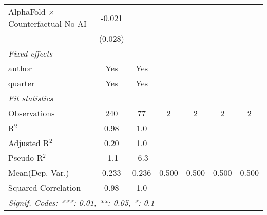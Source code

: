 \begin{tabular}{lcccccc}
   AlphaFold $\times$ Counterfactual No AI  & -0.021        &                &     &     &     &   \\   
                                            & (0.028)       &                &     &     &     &   \\   
   \midrule
   \emph{Fixed-effects}\\
   author                                   & Yes           & Yes            &     &     &     & \\  
   quarter                                  & Yes           & Yes            &     &     &     & \\  
   \midrule
   \emph{Fit statistics}\\
   Observations                             & 240           & 77             & 2   & 2   & 2   & 2\\  
   R$^2$                                    & 0.98          & 1.0            &     &     &     & \\  
   Adjusted R$^2$                           & 0.20          & 1.0            &     &     &     & \\  
   Pseudo R$^2$                             & -1.1          & -6.3           &     &     &     & \\  
Mean(Dep. Var.) & 0.233 & 0.236 & 0.500 & 0.500 & 0.500 & 0.500 \\
   Squared Correlation                      & 0.98          & 1.0            &     &     &     & \\  
   \midrule \midrule
   \multicolumn{7}{l}{\emph{Signif. Codes: ***: 0.01, **: 0.05, *: 0.1}}\\
\end{tabular}
\par\endgroup
